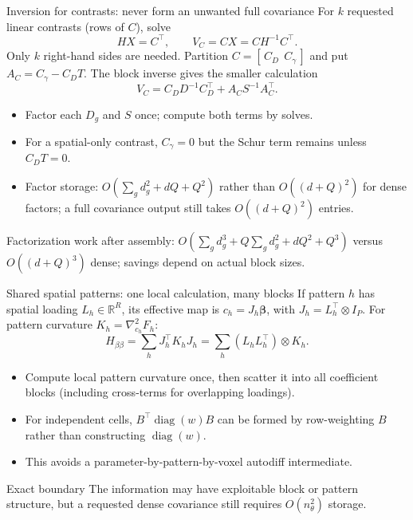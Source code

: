 \documentclass[aspectratio=169,10pt]{beamer}
\newcommand{\R}{\mathbb{R}}
\newcommand{\diag}{\operatorname{diag}}
\newcommand{\bbeta}{\boldsymbol{\beta}}
\begin{document}
\begin{frame}{Inversion for contrasts: never form an unwanted full covariance}
For $k$ requested linear contrasts (rows of $C$), solve
\[
HX=C^\top,\qquad
\boxed{V_C=CX=CH^{-1}C^\top}.
\]
Only $k$ right-hand sides are needed. Partition
$C=[\,C_D\ \ C_\gamma\,]$ and put $A_C=C_\gamma-C_DT$.
The block inverse gives the smaller calculation
\[
\boxed{V_C=C_DD^{-1}C_D^\top+A_CS^{-1}A_C^\top.}
\]
\begin{itemize}
  \item Factor each $D_g$ and $S$ once; compute both terms by solves.
  \item For a spatial-only contrast, $C_\gamma=0$ but the Schur term
        remains unless $C_DT=0$.
  \item Factor storage: $O(\sum_gd_g^2+dQ+Q^2)$ rather than
        $O((d+Q)^2)$ for dense factors; a full covariance output
        still takes $O((d+Q)^2)$ entries.
\end{itemize}
\small Factorization work after assembly:
$O(\sum_gd_g^3+Q\sum_gd_g^2+dQ^2+Q^3)$ versus
$O((d+Q)^3)$ dense; savings depend on actual block sizes.
\end{frame}

\begin{frame}{Shared spatial patterns: one local calculation, many blocks}
If pattern $h$ has spatial loading $L_h\in\R^R$, its effective map is
$c_h=J_h\bbeta$, with $J_h=L_h^\top\otimes I_P$.
For pattern curvature $K_h=\nabla_{c_h}^2F_h$:
\[
H_{\beta\beta}
=\sum_hJ_h^\top K_hJ_h
=\sum_h(L_hL_h^\top)\otimes K_h.
\]
\begin{itemize}
  \item Compute local pattern curvature once, then scatter it into all
        coefficient blocks (including cross-terms for overlapping loadings).
  \item For independent cells, $B^\top\diag(w)B$ can be formed by row-weighting
        $B$ rather than constructing $\diag(w)$.
  \item This avoids a parameter-by-pattern-by-voxel autodiff intermediate.
\end{itemize}
\begin{alertblock}{Exact boundary}
The information may have exploitable block or pattern structure, but a
requested dense covariance still requires $O(n_\theta^2)$ storage.
\end{alertblock}
\end{frame}
\end{document}
